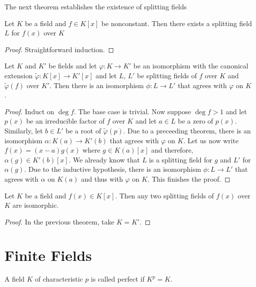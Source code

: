 The next theorem establishes the existence of splitting fields
\begin{theorem}
    Let $K$ be a field and $f\in K[x]$ be nonconstant. Then there exists a splitting field $L$ for $f(x)$ over $K$
\end{theorem}
\begin{proof}
    Straightforward induction.
\end{proof}


\begin{theorem}
    Let $K$ and $K'$ be fields and let $\varphi: K\to K'$ be an isomorphism with the canonical extension $\widetilde{\varphi}:K[x]\to K'[x]$ and let $L$, $L'$ be splitting fields of $f$ over $K$ and $\widetilde{\varphi}(f)$ over $K'$. Then there is an isomorphism $\phi:L\to L'$ that agrees with $\varphi$ on $K$.
\end{theorem}
\begin{proof}
    Induct on $\deg f$. The base case is trivial. Now suppose $\deg f > 1$ and let $p(x)$ be an irreducible factor of $f$ over $K$ and let $a\in L$ be a zero of $p(x)$. Similarly, let $b\in L'$ be a root of $\widetilde{\varphi}(p)$. Due to a preceeding theorem, there is an isomorphism $\alpha: K(a)\to K'(b)$ that agrees with $\varphi$ on $K$. Let us now write $f(x) = (x - a)g(x)$ where $g\in K(a)[x]$ and therefore, $\alpha(g)\in K'(b)[x]$. We already know that $L$ is a splitting field for $g$ and $L'$ for $\alpha(g)$. Due to the inductive hypothesis, there is an isomorphism $\phi:L\to L'$ that agrees with $\alpha$ on $K(a)$ and thus with $\varphi$ on $K$. This finishes the proof.
\end{proof}

\begin{corollary}
    Let $K$ be a field and $f(x)\in K[x]$. Then any two splitting fields of $f(x)$ over $K$ are isomorphic.
\end{corollary}
\begin{proof}
    In the previous theorem, take $K = K'$.
\end{proof}

\section{Finite Fields}
\begin{definition}
    A field $K$ of characteristic $p$ is called perfect if $K^p = K$.
\end{definition}

